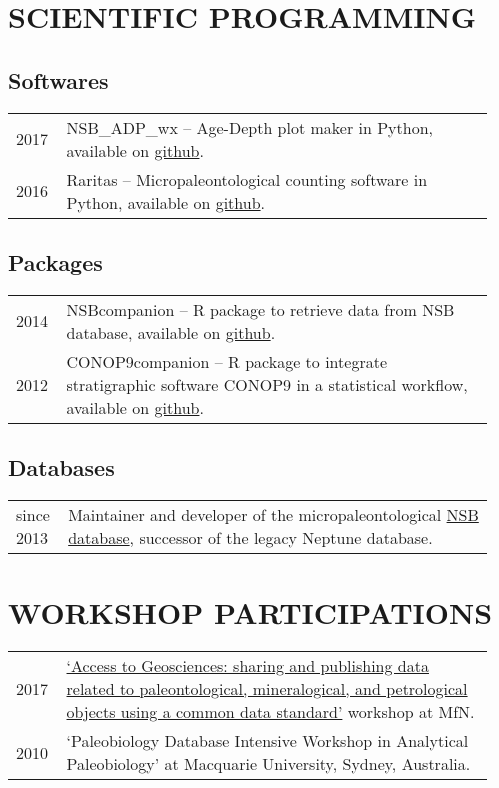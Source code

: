\documentclass[11pt, a4paper]{article}
\begin{document}
\section{SCIENTIFIC PROGRAMMING}
\subsection{Softwares}
\begin{longtable}{p{0.1\linewidth} P{0.85\linewidth}}
2017 & NSB\_ADP\_wx -- Age-Depth plot maker in Python, available on \href{http://github.com/plannapus/NSB_ADP_wx/releases}{github}.\\
2016 & Raritas -- Micropaleontological counting software in Python, available on \href{http://github.com/plannapus/Raritas/releases}{github}.\\
\end{longtable}
\subsection{Packages}
\begin{longtable}{p{0.1\linewidth} P{0.85\linewidth}}
2014 & NSBcompanion -- R package to retrieve data from NSB database, available on \href{http://github.com/plannapus/NSB}{github}.\\
2012 & CONOP9companion -- R package to integrate stratigraphic software CONOP9 in a statistical workflow, available on \href{http://github.com/plannapus/CONOP9companion}{github}.\\
\end{longtable}
\subsection{Databases}
\begin{longtable}{p{0.1\linewidth} P{0.85\linewidth}}
since 2013 & Maintainer and developer of the micropaleontological \href{http://nsb-mfn-berlin.de/}{NSB database}, successor of the legacy Neptune database.\\
\end{longtable}

\section{WORKSHOP PARTICIPATIONS}
\begin{longtable}{p{0.1\linewidth} P{0.85\linewidth}}
2017 & \href{https://abcd.biowikifarm.net/wiki/Events:WorkshopEFG2017}{`Access to Geosciences: sharing and publishing data related to paleontological, mineralogical, and petrological objects using a common data standard'} workshop at MfN.\\
2010 & `Paleobiology Database Intensive Workshop in Analytical Paleobiology' at Macquarie University, Sydney, Australia.\\
\end{longtable}
\end{document}
